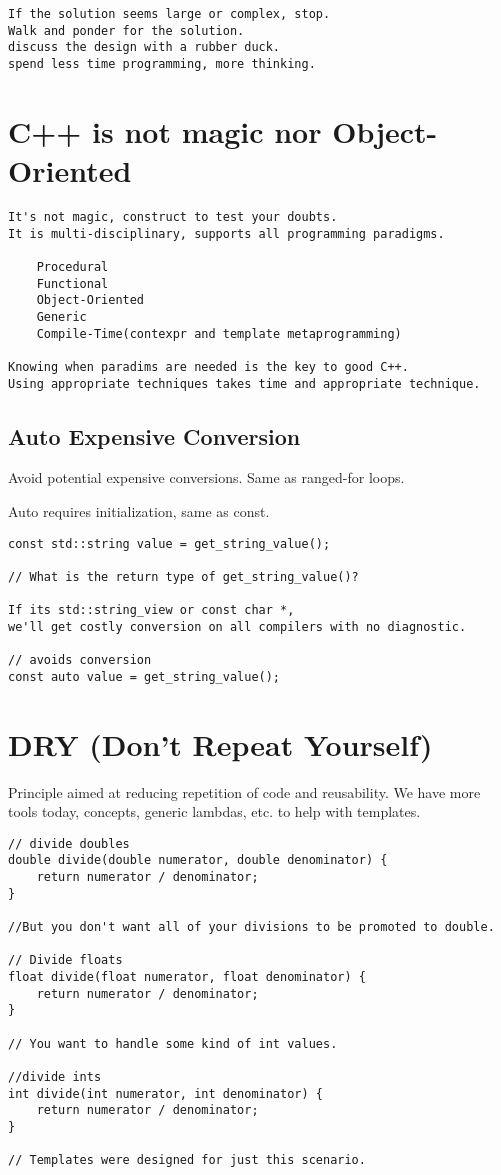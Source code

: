 \documentclass[openany]{report}
\begin{document}
\begin{verbatim}
If the solution seems large or complex, stop. 
Walk and ponder for the solution. 
discuss the design with a rubber duck. 
spend less time programming, more thinking.
\end{verbatim}

\section{C++ is not magic nor Object-Oriented}

\begin{verbatim}
It's not magic, construct to test your doubts.
It is multi-disciplinary, supports all programming paradigms.

    Procedural
    Functional
    Object-Oriented
    Generic
    Compile-Time(contexpr and template metaprogramming)

Knowing when paradims are needed is the key to good C++.
Using appropriate techniques takes time and appropriate technique. 
\end{verbatim}

\subsection{Auto Expensive Conversion}

Avoid potential expensive conversions. Same as ranged-for loops. 

Auto requires initialization, same as const. 

\begin{verbatim}
const std::string value = get_string_value();

// What is the return type of get_string_value()? 

If its std::string_view or const char *,
we'll get costly conversion on all compilers with no diagnostic. 

// avoids conversion
const auto value = get_string_value();
\end{verbatim}

\section{DRY (Don't Repeat Yourself)}

Principle aimed at reducing repetition of code and reusability. 
We have more tools today, concepts, generic lambdas, etc. to help with templates.

\begin{verbatim}
// divide doubles
double divide(double numerator, double denominator) {
    return numerator / denominator;
}

//But you don't want all of your divisions to be promoted to double. 

// Divide floats
float divide(float numerator, float denominator) {
    return numerator / denominator;
}

// You want to handle some kind of int values. 

//divide ints
int divide(int numerator, int denominator) {
    return numerator / denominator;
}

// Templates were designed for just this scenario. 
\end{verbatim}
\end{document}
